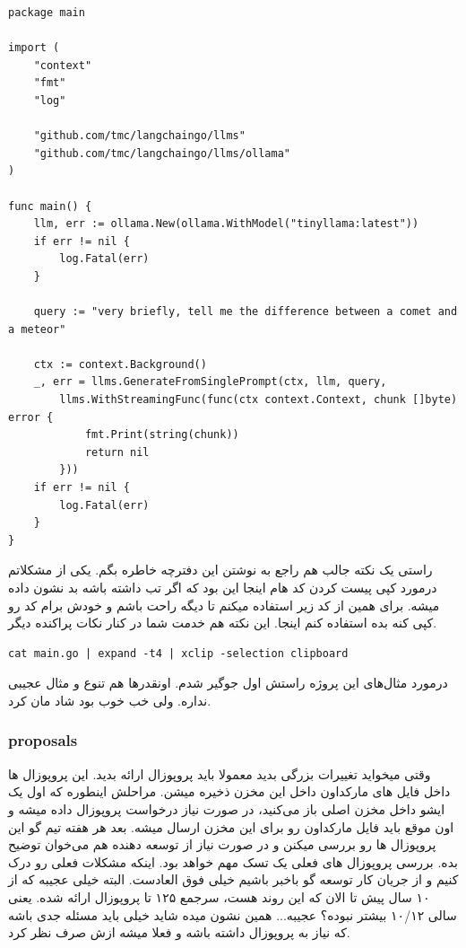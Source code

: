 \begin{latin}
\begin{verbatim}
package main

import (
    "context"
    "fmt"
    "log"

    "github.com/tmc/langchaingo/llms"
    "github.com/tmc/langchaingo/llms/ollama"
)

func main() {
    llm, err := ollama.New(ollama.WithModel("tinyllama:latest"))
    if err != nil {
        log.Fatal(err)
    }

    query := "very briefly, tell me the difference between a comet and a meteor"

    ctx := context.Background()
    _, err = llms.GenerateFromSinglePrompt(ctx, llm, query,
        llms.WithStreamingFunc(func(ctx context.Context, chunk []byte) error {
            fmt.Print(string(chunk))
            return nil
        }))
    if err != nil {
        log.Fatal(err)
    }
}
\end{verbatim}
\end{latin}

راستی یک نکته جالب هم راجع به نوشتن این دفترچه خاطره بگم. یکی از مشکلاتم درمورد کپی پیست کردن کد هام اینجا این بود که
اگر تب داشته باشه بد نشون داده میشه. برای همین از کد زیر استفاده میکنم تا دیگه راحت باشم و خودش برام کد رو کپی کنه بده استفاده کنم اینجا.
این نکته هم خدمت شما در کنار نکات پراکنده دیگر.

\begin{latin}
\begin{verbatim}
cat main.go | expand -t4 | xclip -selection clipboard
\end{verbatim}
\end{latin}

درمورد مثال‌های این پروژه راستش اول جوگیر شدم. اونقدرها هم تنوع و مثال عجیبی نداره. ولی خب خوب بود شاد مان کرد.

\subsubsection{proposals}
وقتی میخواید تغییرات بزرگی بدید معمولا باید پروپوزال ارائه بدید. این پروپوزال ها داخل فایل های مارکداون داخل این مخزن ذخیره میشن.
مراحلش اینطوره که اول یک ایشو داخل مخزن اصلی باز می‌کنید، در صورت نیاز درخواست پروپوزال داده میشه و اون موقع باید فایل مارکداون
رو برای این مخزن  ارسال میشه. بعد هر هفته تیم  گو این پروپوزال ها رو بررسی میکنن و در صورت نیاز از توسعه دهنده هم
می‌خوان توضیح بده. 
بررسی پروپوزال های فعلی یک تسک مهم خواهد بود. اینکه مشکلات فعلی رو درک کنیم و از جریان کار توسعه گو باخبر باشیم خیلی فوق العادست.
البته خیلی عجیبه که از ۱۰ سال پیش تا الان که این روند هست، سرجمع ۱۲۵ تا پروپوزال ارائه شده. یعنی سالی ۱۰/۱۲ بیشتر نبوده؟ عجیبه...
همین نشون میده شاید خیلی باید مسئله جدی باشه که نیاز به پروپوزال داشته باشه و فعلا میشه ازش صرف نظر کرد.

